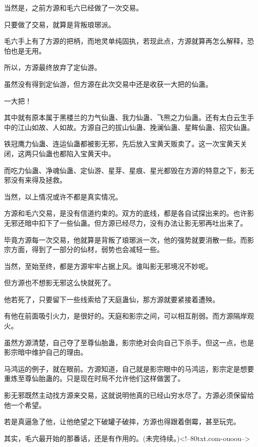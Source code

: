 \begin{this_body}
当然是，之前方源和毛六已经做了一次交易。

只要做了交易，就算是背叛琅琊派。

毛六手上有了方源的把柄，而地灵单纯固执，若现此点，方源就算再怎么解释，恐怕也是无用。

所以，方源最终放弃了定仙游。

虽然没有得到定仙游，但方源在此次交易中还是收获一大把的仙蛊。

一大把！

其中就有原本属于黑楼兰的力气仙蛊、我力仙蛊、飞熊之力仙蛊。还有太白云生手中的江山如故、人如故。方源自己的拔山仙蛊、挽澜仙蛊、星眸仙蛊、招灾仙蛊。

铁冠鹰力仙蛊、连运仙蛊都被影无邪，先后放入宝黄天贩卖了。这一次宝黄天关闭，这两只仙蛊也都陷入宝黄天中。

而吃力仙蛊、净魂仙蛊、定仙游、星芽、星痕、星光都毁在方源的特意之下，影无邪没有来得及拯救。

当然，以上情况或许不都是真实情况。

方源和毛六交易，是没有信道约束的。双方的底线，都是各自试探出来的。也许影无邪还暗中扣下了一些仙蛊。但方源已经尽力，没有办法让影无邪再吐出来了。

毕竟方源每一次交易，他就算是背叛了琅琊派一次，他的强势就要消散一些。而影宗方面，得到了一部分的仙材，弱势也会减轻一些。

当然，至始至终，都是方源牢牢占据上风。谁叫影无邪境况不妙呢。

但方源也不想影无邪这么快就死了。

他若死了，只要留下一些线索给了天庭蛊仙，那方源就要紧接着遭殃。

有他在前面吸引火力，是很好的。天庭和影宗之间，可以相互削弱。而方源隔岸观火。

虽然方源清楚，自己夺了至尊仙胎蛊，影宗绝对会向自己下杀手。但这一点，也是影宗暗中维护自己的理由。

马鸿运的例子，就在眼前。方源知道，自己就是影宗眼中的马鸿运，影宗定是想要重炼至尊仙胎蛊的。只是现在时局不允许他们这样做罢了。

影无邪既然主动找方源来交易，这就说明他真的已经山穷水尽了。方源必须保留给他一个希望。

若是真逼急了他，让他绝望之下破罐子破摔，方源也得跟着倒霉，甚至玩完。

其实，毛六最开始的那番话，还是有作用的。(未完待续。)<!--80txt.com-ouoou-->

\end{this_body}

